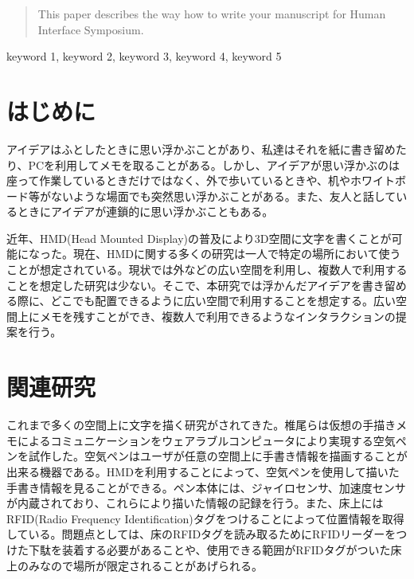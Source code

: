 \documentclass{hissymp}
\begin{document}

\begin{abstract}
This paper describes the way how to write your manuscript for Human Interface Symposium.
\end{abstract}

\begin{keyword}	
keyword 1, keyword 2, keyword 3, keyword 4, keyword 5
\end{keyword}

\maketitle	



\section{はじめに}
アイデアはふとしたときに思い浮かぶことがあり、私達はそれを紙に書き留めたり、PCを利用してメモを取ることがある。しかし、アイデアが思い浮かぶのは座って作業しているときだけではなく、外で歩いているときや、机やホワイトボード等がないような場面でも突然思い浮かぶことがある。また、友人と話しているときにアイデアが連鎖的に思い浮かぶこともある。

近年、HMD(Head Mounted Display)の普及により3D空間に文字を書くことが可能になった。現在、HMDに関する多くの研究は一人で特定の場所において使うことが想定されている。現状では外などの広い空間を利用し、複数人で利用することを想定した研究は少ない。そこで、本研究では浮かんだアイデアを書き留める際に、どこでも配置できるように広い空間で利用することを想定する。広い空間上にメモを残すことができ、複数人で利用できるようなインタラクションの提案を行う。


\section{関連研究}
これまで多くの空間上に文字を描く研究がされてきた。椎尾ら\cite{tex1,tex2}は仮想の手描きメモによるコミュニケーションをウェアラブルコンピュータにより実現する空気ペンを試作した。空気ペンはユーザが任意の空間上に手書き情報を描画することが出来る機器である。HMDを利用することによって、空気ペンを使用して描いた手書き情報を見ることができる。ペン本体には、ジャイロセンサ、加速度センサが内蔵されており、これらにより描いた情報の記録を行う。また、床上にはRFID(Radio Frequency Identification)タグをつけることによって位置情報を取得している。問題点としては、床のRFIDタグを読み取るためにRFIDリーダーをつけた下駄を装着する必要があることや、使用できる範囲がRFIDタグがついた床上のみなので場所が限定されることがあげられる。
\end{document}
